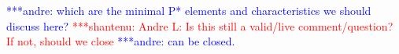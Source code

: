 \documentclass[conference,final]{IEEEtran}
\newcommand{\jhanote}[1]{ {\textcolor{red} { ***shantenu: #1 }}}
\newcommand{\alnote}[1]{ {\textcolor{blue} { ***andre: #1 }}}
\newcommand{\alnote}[1]{}
\newcommand{\jhanote}[1]{}
\begin{document}




\alnote{which are the minimal P* elements and characteristics we
  should discuss here?}  \jhanote{Andre L: Is this still a valid/live
  comment/question? If not, should we close}\alnote{can be closed.}
\end{document}
